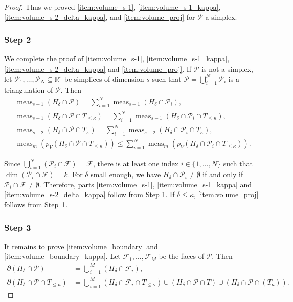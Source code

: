 \documentclass[JEP,XML,SOM,Unicode,published]{cedram}
\let\del\delta
\newcommand{\calP}{\mathcal{P}}
\newcommand\RR{\mathbb{R}}
\DeclareMathOperator{\meas}{meas}
\theoremstyle{definition}
\numberwithin{theorem}{section}
\begin{document}
\begin{proof}
Thus we proved \eqref{item:volume_s-1}, \eqref{item:volume_s-1_kappa}, \eqref{item:volume_s-2_delta_kappa}, and \eqref{item:volume_proj} for $\mathcal P$ a simplex.

\subsubsection*{Step 2} We complete the proof of \eqref{item:volume_s-1}, \eqref{item:volume_s-1_kappa}, \eqref{item:volume_s-2_delta_kappa} and \eqref{item:volume_proj}. If $\mathcal P$ is not a simplex,
let $\mathcal P_1,\dots,\mathcal P_N\subseteq\RR^s$ be simplices of dimension $s$
such that $\mathcal P=\bigcup_{i=1}^N\mathcal P_i$ is a triangulation of $\mathcal P$.
Then
\begin{gather*}
\meas_{s-1}(H_\delta\cap\mathcal P)=\sum_{i=1}^N\meas_{s-1}(H_\delta\cap\mathcal P_i),\\
\meas_{s-1}(H_\delta\cap\mathcal P\cap T_{\leq\kappa})
=\sum_{i=1}^N\meas_{s-1}(H_\delta\cap\mathcal P_i\cap T_{\leq\kappa}),\\
\meas_{s-2} (H_\delta \cap \mathcal P \cap T_{\kappa})
=\sum_{i=1}^N\meas_{s-2} (H_\delta \cap \mathcal P_i \cap T_{\kappa}),\\
\meas_m (p_V(H_\delta\cap \mathcal P\cap T_{\leq\kappa}))\leq\sum_{i=1}^N\meas_m (p_V(H_\delta\cap \mathcal P_i\cap T_{\leq\kappa})).
\end{gather*}

Since $\bigcup_{i=1}^N(\mathcal P_i\cap\mathcal F)=\mathcal F$,
there is at least one index $i\in\{1,\dots,N\}$ such that $\dim(\mathcal P_i\cap\mathcal F)=k$.
For $\delta$ small enough, we have $H_\delta\cap\mathcal P_i\neq\emptyset$ if and only if
$\mathcal P_i\cap\mathcal F\neq\emptyset$.
Therefore, parts \eqref{item:volume_s-1}, \eqref{item:volume_s-1_kappa}
and \eqref{item:volume_s-2_delta_kappa} follow from Step 1. If $\delta\leq\kappa$, \eqref{item:volume_proj} follows from Step~1.

\subsubsection*{Step 3} It remains to prove \eqref{item:volume_boundary} and \eqref{item:volume_boundary_kappa}.
Let $\mathcal F_1,\dots, \mathcal F_M$ be the faces of $\mathcal P$. Then
\begin{align*}
\partial (H_{\del}\cap \calP)
&=\bigcup_{i=1}^M (H_{\del}\cap \mathcal F_i),\\
\partial (H_{\del}\cap \calP\cap T_{\leq\kappa})
&=\bigcup_{i=1}^M (H_{\del}\cap \mathcal F_i\cap T_{\leq\kappa})
\cup (H_{\del}\cap \calP\cap T)
\cup (H_{\del}\cap \calP\cap (T_{\kappa})).
\end{align*}


\end{proof}
\end{document}
